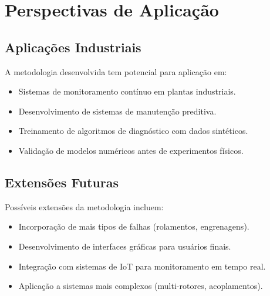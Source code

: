 \section{Perspectivas de Aplicação}

\subsection{Aplicações Industriais}

A metodologia desenvolvida tem potencial para aplicação em:

\begin{itemize}
    \item Sistemas de monitoramento contínuo em plantas industriais.
    \item Desenvolvimento de sistemas de manutenção preditiva.
    \item Treinamento de algoritmos de diagnóstico com dados sintéticos.
    \item Validação de modelos numéricos antes de experimentos físicos.
\end{itemize}

\subsection{Extensões Futuras}

Possíveis extensões da metodologia incluem:

\begin{itemize}
    \item Incorporação de mais tipos de falhas (rolamentos, engrenagens).
    \item Desenvolvimento de interfaces gráficas para usuários finais.
    \item Integração com sistemas de IoT para monitoramento em tempo real.
    \item Aplicação a sistemas mais complexos (multi-rotores, acoplamentos).
\end{itemize}
